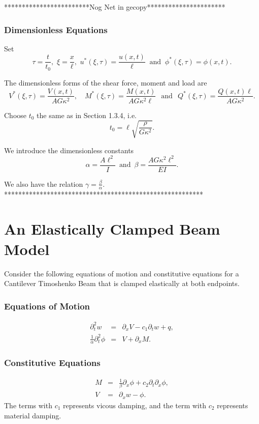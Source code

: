\documentclass[../../main.tex]{subfiles}
\begin{document}
************************Nog Net in gecopy**********************
\subsubsection{Dimensionless Equations}

Set \[\tau = \frac{t}{t_0}, \,\, \xi = \frac{x}{\ell}, \,\, u^*(\xi,\tau) = \frac{u(x,t)}{\ell} \ \text{ and } \ \phi^*(\xi, \tau) = \phi(x,t).\]

The dimensionless forms of the shear force, moment and load are \[ V^{*}(\xi,\tau) = \frac{V(x,t)}{AG\kappa^2}, \quad M^{*}(\xi,\tau) = \frac{M(x,t)}{A G\kappa^2 \ell} \,\,\, \ \text{and} \ \,\,\, Q^*(\xi,\tau) = \frac{Q(x,t)\ell}{A G\kappa^2}.\]

Choose $t_0$ the same as in Section 1.3.4, i.e. \[t_0 = \ell\sqrt{\frac{\rho}{G\kappa^2}}.\]

We introduce the dimensionless constants
\begin{equation*}
\alpha = \frac{A \ell^2}{I} \,\,\, \text{and} \,\,\, \beta
=\frac{AG\kappa^2 \ell^2}{EI}.
\end{equation*}

We also have the relation $\gamma = \frac{\beta}{\alpha}$.\\
********************************************************\\

\section{An Elastically Clamped Beam Model}
Consider the following equations of motion and constitutive equations for a Cantilever Timoshenko Beam that is clamped elastically at both endpoints.
\subsubsection*{Equations of Motion}
\begin{eqnarray}
	\partial_t^2 w &=& \partial_x V - c_1\partial_t w  +q, \label{CT_1}\\
	\frac{1}{\alpha}\partial_t^2 \phi &=& V+\partial_xM. \label{CT_2}
\end{eqnarray}

\noindent
\subsubsection*{Constitutive Equations}
\begin{eqnarray}
	M &=& \frac{1}{\beta}\partial_x \phi +c_2 \partial_t \partial_x \phi,\label{CT_3}\\
	V&=& \partial_x w - \phi.\label{CT_4}
\end{eqnarray}
The terms with $c_1$ represents vicous damping, and the term with $c_2$ represents material damping.\\
\end{document}

